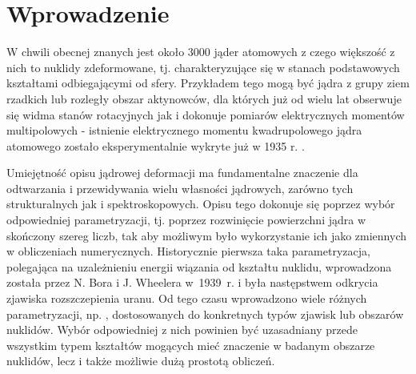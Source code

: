 \documentclass[a4paper,polish,twoside]{article}
\numberwithin{equation}{section}
\begin{document}
\clearpage
\section{Wprowadzenie}

W chwili obecnej znanych jest około 3000 jąder atomowych z czego większość z nich to nuklidy zdeformowane, tj. charakteryzujące się w stanach podstawowych kształtami odbiegającymi od sfery. Przykładem tego mogą być jądra z grupy ziem rzadkich lub rozległy obszar aktynowców, dla których już od wielu lat obserwuje się widma stanów rotacyjnych  jak i dokonuje pomiarów elektrycznych momentów multipolowych - istnienie elektrycznego momentu kwadrupolowego jądra atomowego zostało eksperymentalnie wykryte już w 1935 r. \cite{1935}.

Umiejętność opisu jądrowej deformacji ma fundamentalne znaczenie dla odtwarzania i przewidywania wielu własności jądrowych, zarówno tych strukturalnych jak i spektroskopowych. Opisu tego dokonuje się poprzez wybór odpowiedniej parametryzacji, tj. poprzez rozwinięcie powierzchni jądra w skończony szereg liczb, tak aby możliwym było wykorzystanie ich jako zmiennych w obliczeniach numerycznych. Historycznie pierwsza taka parametryzacja, polegająca na uzależnieniu energii wiązania od kształtu nuklidu, wprowadzona została przez N. Bora i J. Wheelera w~1939~r. \cite{1939} i była następstwem odkrycia zjawiska rozszczepienia uranu. Od tego czasu wprowadzono wiele różnych parametryzacji, np. \cite{parametryzacje}, dostosowanych do konkretnych typów zjawisk lub obszarów nuklidów. Wybór odpowiedniej z nich powinien być uzasadniany przede wszystkim typem kształtów mogących mieć znaczenie w badanym obszarze nuklidów, lecz i także możliwie dużą prostotą obliczeń.
\end{document}

